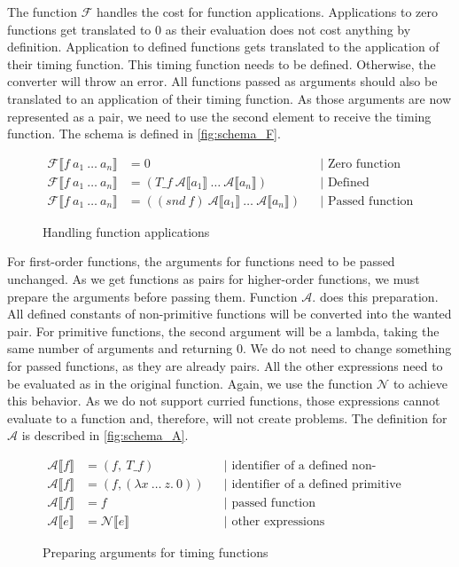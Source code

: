 The function $\mathcal{F}$ handles the cost for function applications.
Applications to zero functions get translated to $0$ as their evaluation does not cost anything by definition.
Application to defined functions gets translated to the application of their timing function.
This timing function needs to be defined. Otherwise, the converter will throw an error.
All functions passed as arguments should also be translated to an application of their timing function.
As those arguments are now represented as a pair, we need to use the second element to receive the timing function.
The schema is defined in \autoref{fig:schema_F}.
\begin{figure}
\begin{align*}
  \mathcal{F}\llbracket f\ a_{1}\ \dots\ a_{n}\rrbracket &= 0 &&\text{| Zero function}\\
  \mathcal{F}\llbracket f\ a_{1}\ \dots\ a_{n}\rrbracket &= (T\_f\ \mathcal{A}\llbracket a_{1}\rrbracket\ \dots\ \mathcal{A}\llbracket a_{n}\rrbracket) &&\text{| Defined function}\\
  \mathcal{F}\llbracket f\ a_{1}\ \dots\ a_{n}\rrbracket &= ((snd\ f)\ \mathcal{A}\llbracket a_{1}\rrbracket\ \dots\ \mathcal{A}\llbracket a_{n}\rrbracket) &&\text{| Passed function}
\end{align*}
\caption{Handling function applications}
\label{fig:schema_F}
\end{figure}

For first-order functions, the arguments for functions need to be passed unchanged.
As we get functions as pairs for higher-order functions, we must prepare the arguments before passing them.
Function $\mathcal{A}$. does this preparation.
All defined constants of non-primitive functions will be converted into the wanted pair.
For primitive functions, the second argument will be a lambda, taking the same number of arguments and returning $0$.
We do not need to change something for passed functions, as they are already pairs.
All the other expressions need to be evaluated as in the original function.
Again, we use the function $\mathcal{N}$ to achieve this behavior.
As we do not support curried functions, those expressions cannot evaluate to a function and, therefore, will not create problems.
The definition for $\mathcal{A}$ is described in \autoref{fig:schema_A}.
\begin{figure}
  \begin{align*}
    \mathcal{A}\llbracket f\rrbracket &= (f,\ T\_f) &&\text{| identifier of a defined non-primitive function}\\
    \mathcal{A}\llbracket f\rrbracket &= (f, (\lambda x\ \dots\ z.\ 0)) &&\text{| identifier of a defined primitive function}\\
    \mathcal{A}\llbracket f\rrbracket &= f &&\text{| passed function}\\
    \mathcal{A}\llbracket e\rrbracket &= \mathcal{N}\llbracket e\rrbracket &&\text{| other expressions}
  \end{align*}
  \caption{Preparing arguments for timing functions}
  \label{fig:schema_A}
\end{figure}

